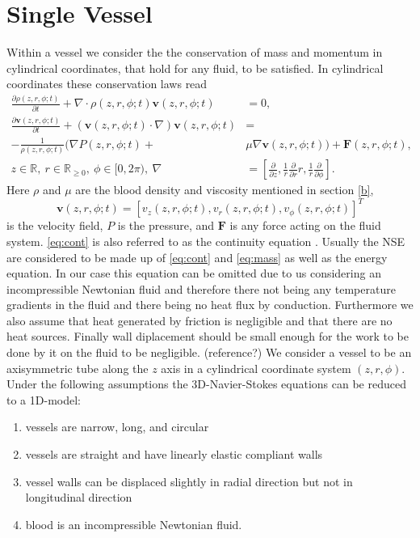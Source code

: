 \documentclass[a4paper, oneside]{discothesis}
\begin{document}
\section{Single Vessel} \label{sec:sv}
Within a vessel we consider the the conservation of mass and momentum in cylindrical coordinates, that hold for any fluid, to be satisfied.
In cylindrical coordinates these conservation laws read
\begin{align}
	\frac{\partial \rho (z,r,\phi; t)}{\partial t} + \nabla \cdot \rho (z,r,\phi; t)\mathbf{v}(z,r,\phi; t) &= 0, \label{eq:cont}\\
	\frac{\partial \mathbf{v}(z,r,\phi; t)}{\partial t} + \left( \mathbf{v}(z,r,\phi; t) \cdot \nabla \right) \mathbf{v}(z,r,\phi; t) &= \\
	- \frac{1}{\rho (z,r,\phi; t)} (\nabla P(z,r,\phi; t) + &\mu \nabla \mathbf{v}(z,r,\phi; t)) + \mathbf{F}(z,r,\phi; t), \label{eq:mass} \\
	z \in \mathbb{R}, \ r \in \mathbb{R}_{\geq 0}, \ \phi \in [0, 2\pi), \ \nabla &= \left[\frac{\partial}{\partial z}, \frac{1}{r}\frac{\partial}{\partial r}r, \frac{1}{r}\frac{\partial}{\partial \phi}  \right].
\end{align}
Here $\rho$ and $\mu$ are the blood density and viscosity mentioned in section \ref{b}, 
\begin{equation}
	\mathbf{v}(z,r,\phi; t) = \left[ v_z(z,r,\phi; t), v_r(z,r,\phi; t), v_\phi (z,r,\phi; t) \right]^T
\end{equation}
	is the velocity field, $P$ is the pressure, and $\mathbf{F}$ is any force acting on the fluid system.
\autoref{eq:cont} is also referred to as the continuity equation \cite{anderson2011ebook}.
Usually the NSE are considered to be made up of \autoref{eq:cont} and \autoref{eq:mass} as well as the energy equation.
In our case this equation can be omitted due to us considering an incompressible Newtonian fluid and therefore there not being any temperature gradients in the fluid and there being no heat flux by conduction.
Furthermore we also assume that heat generated by friction is negligible and that there are no heat sources.
Finally wall diplacement should be small enough for the work to be done by it on the fluid to be negligible. (reference?)
We consider a vessel to be an axisymmetric tube along the $z$ axis in a cylindrical coordinate system $\left(z,r,\phi\right)$.
Under the following assumptions the 3D-Navier-Stokes equations can be reduced to a 1D-model:

\begin{enumerate}
	\item vessels are narrow, long, and circular
	\item vessels are straight and have linearly elastic compliant walls
	\item vessel walls can be displaced slightly in radial direction but not in longitudinal direction
	\item blood is an incompressible Newtonian fluid.
\end{enumerate}
\end{document}
